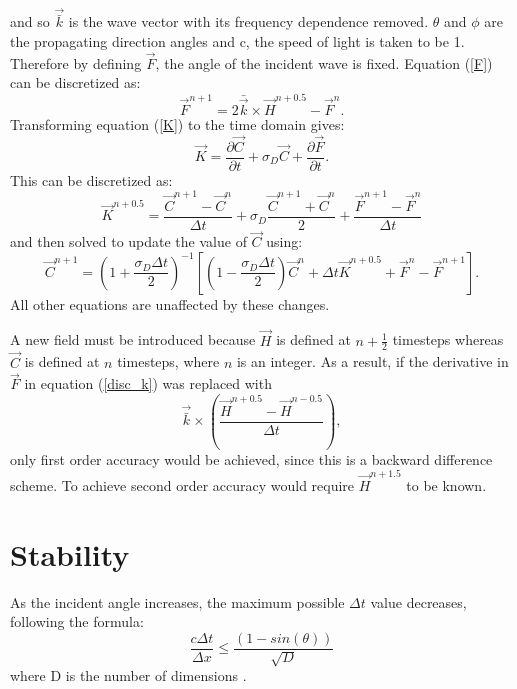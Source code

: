 \documentclass{article}
\begin{document}
and so $\vec{\bar{k}}$ is the wave vector with its frequency dependence removed. $\theta$ and $\phi$ are the propagating direction angles and c, the speed of light is taken to be 1. Therefore by defining $\vec{F}$, the angle of the incident wave is fixed.
Equation (\ref{F}) can be discretized as:
\begin{equation}
\vec{F}^{n+1}=2\bar{\vec{k}}\times\vec{H}^{n+0.5} -\vec{F}^{n} .
\end{equation}
Transforming equation (\ref{K}) to the time domain gives:
\begin{equation}
\vec{K} = \frac{\partial \vec{C}}{\partial t}+\sigma_{D}\vec{C}+\frac{\partial \vec{F}}{\partial t} .
\end{equation}
This can be discretized as:
\begin{equation} \label{disc_k}
\vec{K}^{n+0.5}=\frac{\vec{C}^{n+1}-\vec{C}^n}{\Delta t}+\sigma_{D}\frac{\vec{C}^{n+1}+\vec{C}^n}{2} + \frac{\vec{F}^{n+1}-\vec{F}^{n}}{\Delta t}
\end{equation}
and then solved to update the value of $\vec{C}$ using:
\begin{equation}
\vec{C}^{n+1}=(1+\frac{\sigma_{D} \Delta t}{2})^{-1} [(1-\frac{\sigma_D \Delta t}{2}) \vec{C}^n+\Delta t\vec{K}^{n+0.5}+\vec{F}^{n}-\vec{F}^{n+1}] .
\end{equation}
All other equations are unaffected by these changes.

A new field must be introduced because $\vec{H}$ is defined at $n+\frac{1}{2}$ timesteps whereas $\vec{C}$ is defined at $n$ timesteps, where $n$ is an integer. As a result, if the derivative in $\vec{F}$ in equation (\ref{disc_k}) was replaced with
\begin{equation}
\vec{\bar{k}}\times(\frac{\vec{H}^{n+0.5}-\vec{H}^{n-0.5}}{\Delta t}),
\end{equation}
only first order accuracy would be achieved, since this is a backward difference scheme. To achieve second order accuracy would require $\vec{H}^{n+1.5}$ to be known.

\section{Stability}
As the incident angle increases, the maximum possible $\Delta t$ value decreases, following the formula:
\begin{equation}
\frac{c\Delta t}{\Delta x} \leq \frac{(1-sin(\theta))}{\sqrt{D}}
\end{equation}
where D is the number of dimensions \cite{BFAST}.
\end{document}
